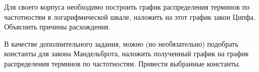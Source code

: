 
Для своего корпуса необходимо построить график распределения терминов по частотностям в
логарифмической шкале, наложить на этот график закон Ципфа. Объяснить причины
расхождения.

В качестве дополнительного задания, можно (но необязательно) подобрать константы для закона
Мандельброта, наложить полученный график на график распределения терминов по
частотностям. Привести выбранные константы.

\pagebreak
